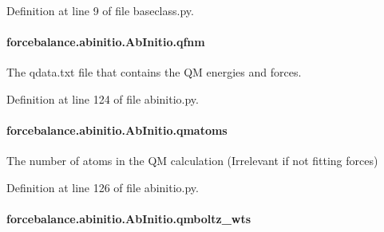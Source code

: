 Definition at line 9 of file baseclass.\-py.

\hypertarget{classforcebalance_1_1abinitio_1_1AbInitio_ac93db408472034937e79572bf872886c}{
\paragraph[{qfnm}]{\setlength{\rightskip}{0pt plus 5cm}forcebalance.\-abinitio.\-Ab\-Initio.\-qfnm\hspace{0.3cm}{\ttfamily [inherited]}}}\label{classforcebalance_1_1abinitio_1_1AbInitio_ac93db408472034937e79572bf872886c}


The qdata.\-txt file that contains the Q\-M energies and forces. 



Definition at line 124 of file abinitio.\-py.

\hypertarget{classforcebalance_1_1abinitio_1_1AbInitio_af0760b8d33ce9dd044ccbe68fba7a1be}{
\paragraph[{qmatoms}]{\setlength{\rightskip}{0pt plus 5cm}forcebalance.\-abinitio.\-Ab\-Initio.\-qmatoms\hspace{0.3cm}{\ttfamily [inherited]}}}\label{classforcebalance_1_1abinitio_1_1AbInitio_af0760b8d33ce9dd044ccbe68fba7a1be}


The number of atoms in the Q\-M calculation (Irrelevant if not fitting forces) 



Definition at line 126 of file abinitio.\-py.

\hypertarget{classforcebalance_1_1abinitio_1_1AbInitio_a06ec6b12d81791ca94f599f41e56335a}{
\paragraph[{qmboltz\-\_\-wts}]{\setlength{\rightskip}{0pt plus 5cm}forcebalance.\-abinitio.\-Ab\-Initio.\-qmboltz\-\_\-wts\hspace{0.3cm}{\ttfamily [inherited]}}}\label{classforcebalance_1_1abinitio_1_1AbInitio_a06ec6b12d81791ca94f599f41e56335a}



